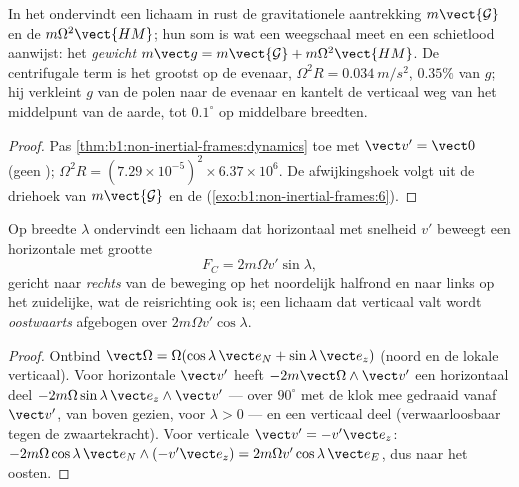 \begin{proposition}\label{prop:b1:non-inertial-frames:weight}
In het  ondervindt een lichaam in rust de gravitationele
aantrekking $m\vect{\mathcal G}$ en de  $m\Omega^2\vect{HM}$; hun
som is wat een weegschaal meet en een schietlood aanwijst: het \emph{gewicht}
$m\vect g = m\vect{\mathcal G} + m\Omega^2\vect{HM}$. De centrifugale term is het grootst
op de evenaar, $\Omega^2R = \qty{0.034}{m/s^2}$, $0.35\%$ van $g$; hij
verkleint $g$ van de polen naar de evenaar en kantelt de verticaal weg
van het middelpunt van de aarde, tot $0.1^\circ$ op middelbare breedten.
\end{proposition}

\begin{proof}
Pas \cref{thm:b1:non-inertial-frames:dynamics} toe met $\vect v' = \vect 0$
(geen ); $\Omega^2R = (7.29\times10^{-5})^2 \times 6.37\times10^6$.
De afwijkingshoek volgt uit de driehoek van $m\vect{\mathcal G}$ en de
 (\cref{exo:b1:non-inertial-frames:6}).
\end{proof}

\begin{proposition}\label{prop:b1:non-inertial-frames:coriolis}
Op breedte $\lambda$ ondervindt een lichaam dat horizontaal met snelheid $v'$ beweegt een
horizontale  met grootte
\[
F_C = 2m\Omega v'\sin\lambda ,
\]
gericht naar \emph{rechts} van de beweging op het noordelijk halfrond en
naar links op het zuidelijke, wat de reisrichting ook is; een
lichaam dat verticaal valt wordt \emph{oostwaarts} afgebogen over $2m\Omega v'\cos\lambda$.
\end{proposition}

\begin{proof}
Ontbind $\vect\Omega = \Omega(\cos\lambda\,\vect e_N + \sin\lambda\,\vect e_z)$
(noord en de lokale verticaal). Voor horizontale $\vect v'$ heeft $-2m\vect\Omega\wedge\vect v'$
een horizontaal deel $-2m\Omega\sin\lambda\,\vect e_z\wedge\vect v'$ --- over
$90^\circ$ met de klok mee gedraaid vanaf $\vect v'$, van boven gezien, voor $\lambda > 0$ ---
en een verticaal deel (verwaarloosbaar tegen de zwaartekracht). Voor verticale $\vect v' =
-v'\vect e_z$: $-2m\Omega\cos\lambda\,\vect e_N\wedge(-v'\vect e_z) = 2m\Omega v'\cos\lambda\,
\vect e_E$, dus naar het oosten.
\end{proof}


